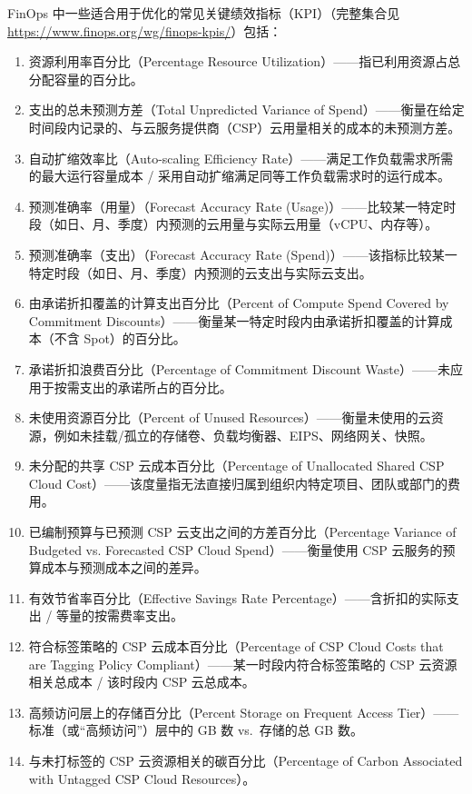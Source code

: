 \documentclass[10pt,UTF8,fontset=fandol]{ctexart}
\begin{document}
FinOps 中一些适合用于优化的常见关键绩效指标（KPI）（完整集合见 \url{https://www.finops.org/wg/finops-kpis/}）包括：

\begin{enumerate}
\item 资源利用率百分比（Percentage Resource Utilization）——指已利用资源占总分配容量的百分比。
\item 支出的总未预测方差（Total Unpredicted Variance of Spend）——衡量在给定时间段内记录的、与云服务提供商（CSP）云用量相关的成本的未预测方差。
\item 自动扩缩效率比（Auto-scaling Efficiency Rate）——满足工作负载需求所需的最大运行容量成本 / 采用自动扩缩满足同等工作负载需求时的运行成本。
\item 预测准确率（用量）（Forecast Accuracy Rate (Usage)）——比较某一特定时段（如日、月、季度）内预测的云用量与实际云用量（vCPU、内存等）。
\item 预测准确率（支出）（Forecast Accuracy Rate (Spend)）——该指标比较某一特定时段（如日、月、季度）内预测的云支出与实际云支出。
\item 由承诺折扣覆盖的计算支出百分比（Percent of Compute Spend Covered by Commitment Discounts）——衡量某一特定时段内由承诺折扣覆盖的计算成本（不含 Spot）的百分比。
\item 承诺折扣浪费百分比（Percentage of Commitment Discount Waste）——未应用于按需支出的承诺所占的百分比。
\item 未使用资源百分比（Percent of Unused Resources）——衡量未使用的云资源，例如未挂载/孤立的存储卷、负载均衡器、EIPS、网络网关、快照。
\item 未分配的共享 CSP 云成本百分比（Percentage of Unallocated Shared CSP Cloud Cost）——该度量指无法直接归属到组织内特定项目、团队或部门的费用。
\item 已编制预算与已预测 CSP 云支出之间的方差百分比（Percentage Variance of Budgeted vs. Forecasted CSP Cloud Spend）——衡量使用 CSP 云服务的预算成本与预测成本之间的差异。
\item 有效节省率百分比（Effective Savings Rate Percentage）——含折扣的实际支出 / 等量的按需费率支出。
\item 符合标签策略的 CSP 云成本百分比（Percentage of CSP Cloud Costs that are Tagging Policy Compliant）——某一时段内符合标签策略的 CSP 云资源相关总成本 / 该时段内 CSP 云总成本。
\item 高频访问层上的存储百分比（Percent Storage on Frequent Access Tier）——标准（或“高频访问”）层中的 GB 数 vs.\ 存储的总 GB 数。
\item 与未打标签的 CSP 云资源相关的碳百分比（Percentage of Carbon Associated with Untagged CSP Cloud Resources）。
\end{enumerate}
\end{document}
